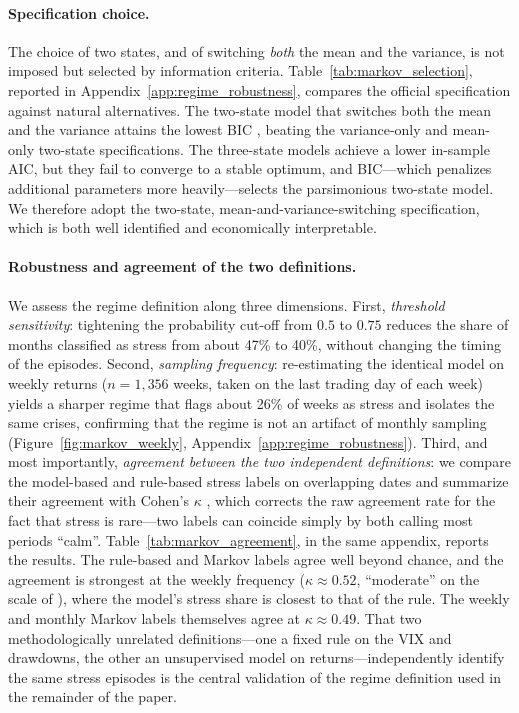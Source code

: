 \paragraph{Specification choice.}
The choice of two states, and of switching \emph{both} the mean and the variance, is not imposed but selected by information criteria. Table~\ref{tab:markov_selection}, reported in Appendix~\ref{app:regime_robustness}, compares the official specification against natural alternatives. The two-state model that switches both the mean and the variance attains the lowest BIC \citep{schwarz1978estimating}, beating the variance-only and mean-only two-state specifications. The three-state models achieve a lower in-sample AIC, but they fail to converge to a stable optimum, and BIC---which penalizes additional parameters more heavily---selects the parsimonious two-state model. We therefore adopt the two-state, mean-and-variance-switching specification, which is both well identified and economically interpretable.

\paragraph{Robustness and agreement of the two definitions.}
We assess the regime definition along three dimensions. First, \emph{threshold sensitivity}: tightening the probability cut-off from $0.5$ to $0.75$ reduces the share of months classified as stress from about 47\% to 40\%, without changing the timing of the episodes. Second, \emph{sampling frequency}: re-estimating the identical model on weekly returns ($n = 1{,}356$ weeks, taken on the last trading day of each week) yields a sharper regime that flags about 26\% of weeks as stress and isolates the same crises, confirming that the regime is not an artifact of monthly sampling (Figure~\ref{fig:markov_weekly}, Appendix~\ref{app:regime_robustness}). Third, and most importantly, \emph{agreement between the two independent definitions}: we compare the model-based and rule-based stress labels on overlapping dates and summarize their agreement with Cohen's $\kappa$ \citep{cohen1960coefficient}, which corrects the raw agreement rate for the fact that stress is rare---two labels can coincide simply by both calling most periods ``calm''. Table~\ref{tab:markov_agreement}, in the same appendix, reports the results. The rule-based and Markov labels agree well beyond chance, and the agreement is strongest at the weekly frequency ($\kappa \approx 0.52$, ``moderate'' on the scale of \citet{landis1977measurement}), where the model's stress share is closest to that of the rule. The weekly and monthly Markov labels themselves agree at $\kappa \approx 0.49$. That two methodologically unrelated definitions---one a fixed rule on the VIX and drawdowns, the other an unsupervised model on returns---independently identify the same stress episodes is the central validation of the regime definition used in the remainder of the paper.

